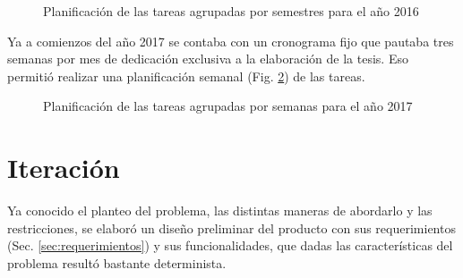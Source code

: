 \begin{figure}[h!]
  \centering
  \caption{Planificaci\'on de las tareas agrupadas por semestres para el año 2016}
  \label{fig:plan2016}
\end{figure}

Ya a comienzos del año 2017 se contaba con un cronograma fijo que pautaba tres semanas por mes de dedicaci\'on exclusiva a la elaboraci\'on de la tesis. Eso permiti\'o realizar una planificaci\'on semanal (Fig. \ref{fig:plan2017}) de las tareas. 

\begin{figure}[h!]
  \centering
  \caption{Planificaci\'on de las tareas agrupadas por semanas para el año 2017}
  \label{fig:plan2017}
\end{figure}

\section{Iteraci\'on}
Ya conocido el planteo del problema, las distintas maneras de abordarlo y las restricciones, se elabor\'o un diseño preliminar del producto con sus requerimientos (Sec. \ref{sec:requerimientos}) y sus funcionalidades, que dadas las caracter\'isticas del problema result\'o bastante determinista.\\

